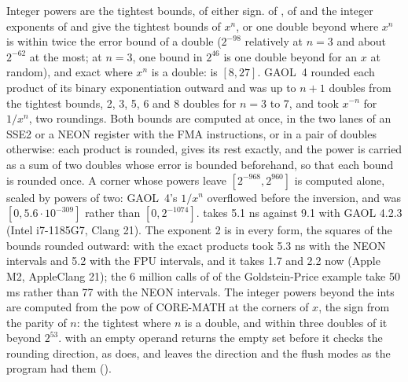 \documentclass[12pt,a4paper,twoside,openright]{book}
\begin{document}
\medskip
Integer powers are the tightest bounds, of either sign.\newinvfive{}
 of ,  of 
and the integer exponents of  and  give the
tightest bounds of $x^n$, or one double beyond where $x^n$ is within twice
the error bound of a double ($2^{-98}$ relatively at $n = 3$ and about
$2^{-62}$ at the most; at $n = 3$, one bound in $2^{46}$ is one double beyond
for an $x$ at random), and exact where $x^n$ is a double:  is $[8, 27]$. GAOL~4 rounded each product of its binary exponentiation
outward and was up to $n + 1$ doubles from the tightest bounds, 2, 3, 5, 6
and 8 doubles for $n = 3$ to 7, and took $x^{-n}$ for $1/x^n$, two roundings.
Both bounds are computed at once, in the two lanes of an SSE2 or a NEON
register with the FMA instructions, or in a pair of doubles otherwise: each
product is rounded,  gives its rest exactly, and the power is
carried as a sum of two doubles whose error is bounded beforehand, so that
each bound is rounded once. A corner whose powers leave
$[2^{-968}, 2^{960}]$ is computed alone, scaled by powers of two: GAOL~4's
$1/x^n$ overflowed before the inversion, and  was
$[0, 5.6 \cdot 10^{-309}]$ rather than $[0, 2^{-1074}]$. 
takes 5.1 ns against 9.1 with GAOL 4.2.3 (Intel i7-1185G7, Clang 21). The
exponent 2 is  in every form, the squares of the bounds rounded
outward: with the exact products  took 5.3 ns with the NEON
intervals and 5.2 with the FPU intervals, and it takes 1.7 and 2.2 now (Apple
M2, AppleClang 21); the 6 million calls of  of the
Goldstein-Price example take 50 ms rather than 77 with the NEON intervals.
The integer powers beyond the ints are computed from the pow of CORE-MATH at
the corners of $x$, the sign from the parity of $n$: the tightest where $n$
is a double, and within three doubles of it beyond $2^{53}$.  with
an empty operand returns the empty set before it checks the rounding
direction, as  does, and leaves the direction and the flush modes
as the program had them ().
\end{document}
